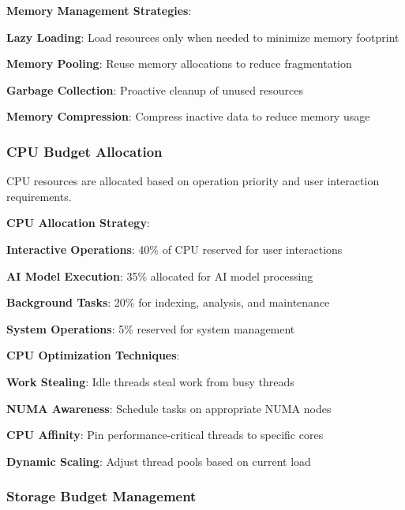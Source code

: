 \textbf{Memory Management Strategies}:
\begin{compactlist}
    \item \textbf{Lazy Loading}: Load resources only when needed to minimize memory footprint
    \item \textbf{Memory Pooling}: Reuse memory allocations to reduce fragmentation
    \item \textbf{Garbage Collection}: Proactive cleanup of unused resources
    \item \textbf{Memory Compression}: Compress inactive data to reduce memory usage
\end{compactlist}

\subsubsection*{CPU Budget Allocation}

CPU resources are allocated based on operation priority and user interaction requirements.

\textbf{CPU Allocation Strategy}:
\begin{compactlist}
    \item \textbf{Interactive Operations}: 40\% of CPU reserved for user interactions
    \item \textbf{AI Model Execution}: 35\% allocated for AI model processing
    \item \textbf{Background Tasks}: 20\% for indexing, analysis, and maintenance
    \item \textbf{System Operations}: 5\% reserved for system management
\end{compactlist}

\textbf{CPU Optimization Techniques}:
\begin{compactlist}
    \item \textbf{Work Stealing}: Idle threads steal work from busy threads
    \item \textbf{NUMA Awareness}: Schedule tasks on appropriate NUMA nodes
    \item \textbf{CPU Affinity}: Pin performance-critical threads to specific cores
    \item \textbf{Dynamic Scaling}: Adjust thread pools based on current load
\end{compactlist}

\subsubsection*{Storage Budget Management}

